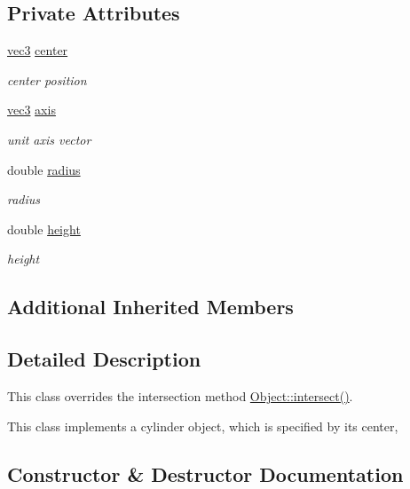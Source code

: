 \subsection*{Private Attributes}
\begin{DoxyCompactItemize}
\item 
\hyperlink{classvec3}{vec3} \hyperlink{classCylinder_a50180f95904cab9cc52c7ebb25aa3ea2}{center}
\begin{DoxyCompactList}\small\item\em center position \end{DoxyCompactList}\item 
\hyperlink{classvec3}{vec3} \hyperlink{classCylinder_a82b22d56b3affae2163dfb474d206227}{axis}
\begin{DoxyCompactList}\small\item\em unit axis vector \end{DoxyCompactList}\item 
double \hyperlink{classCylinder_a8a825799285bcf60b49b8aef0459b498}{radius}
\begin{DoxyCompactList}\small\item\em radius \end{DoxyCompactList}\item 
double \hyperlink{classCylinder_a211cebc37f1025850cdacffe1badb578}{height}
\begin{DoxyCompactList}\small\item\em height \end{DoxyCompactList}\end{DoxyCompactItemize}
\subsection*{Additional Inherited Members}


\subsection{Detailed Description}
This class overrides the intersection method \hyperlink{structObject_ac6549d30793a9b3da070234bf10c7e91}{Object\+::intersect()}. 

This class implements a cylinder object, which is specified by its center, 

\subsection{Constructor \& Destructor Documentation}
